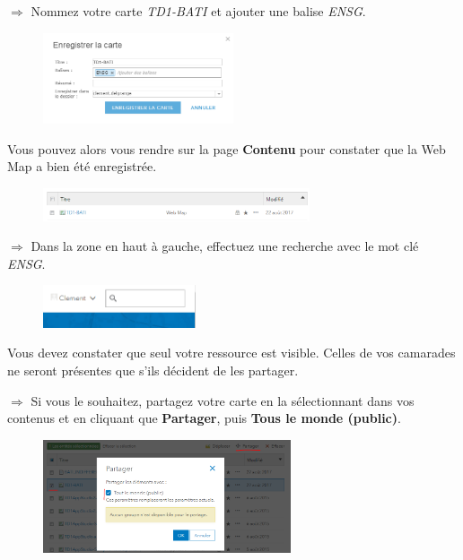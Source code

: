 \documentclass[11pt]{article}
\newcommand{\action}{$\Rightarrow$ }
\begin{document}
\action Nommez votre carte \textit{TD1-BATI} et ajouter une balise \textit{ENSG}. 
\begin{figure}[H]
	\center \includegraphics[width=0.5\textwidth]{img/td1/ago_enregistrer_carte-2.png} \\
\end{figure}

Vous pouvez alors vous rendre sur la page \textbf{Contenu} pour constater que la Web Map a bien été enregistrée.
\begin{figure}[H]
	\center \includegraphics[width=0.7\textwidth]{img/td1/ago_web_map_ok.png} \\
\end{figure}

\action Dans la zone en haut à gauche, effectuez une recherche avec le mot clé \textit{ENSG}.
\begin{figure}[H]
	\center \includegraphics[width=0.4\textwidth]{img/td1/ago_recherche.png} \\
\end{figure}

Vous devez constater que seul votre ressource est visible. Celles de vos camarades ne seront présentes que s'ils décident de les partager.

\action Si vous le souhaitez, partagez votre carte en la sélectionnant dans vos contenus et en cliquant que \textbf{Partager}, puis \textbf{Tous le monde (public)}.
\begin{figure}[H]
	\center \includegraphics[width=0.65\textwidth]{img/td1/ago_partager_carte.png} \\
\end{figure}
\end{document}
